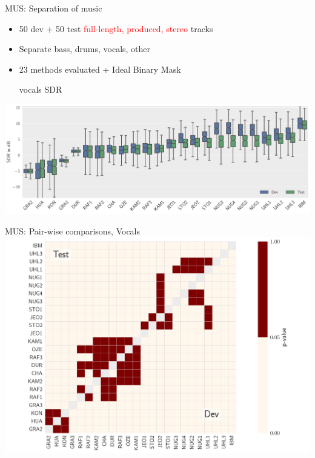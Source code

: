 \documentclass{beamer}
\begin{document}
\begin{frame}{MUS: Separation of music}
\begin{itemize}
\item 50 dev + 50 test \textcolor{red}{full-length, produced, stereo} tracks
\item Separate bass, drums, vocals, other
\item 23 methods evaluated + Ideal Binary Mask
\begin{center}
\vspace{0.5cm}vocals SDR
\end{center}
\end{itemize}
\includegraphics[width=\textwidth]{fig/MUS_SDR.pdf}
\end{frame}

\begin{frame}{MUS: Pair-wise comparisons, Vocals}
\includegraphics[width=\textwidth]{fig/wilcox_voc_sdr_slide.pdf}
\end{frame}
\end{document}
